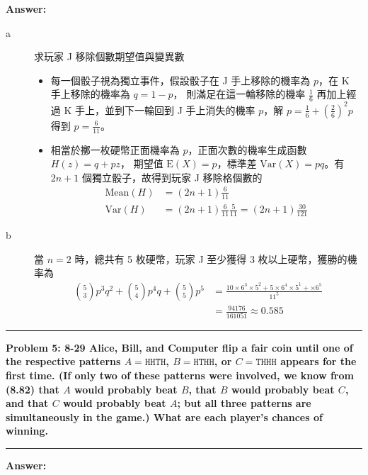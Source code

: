 \documentclass[11pt,fleqn]{article}
\newcommand\question[2]{\vspace{.25in}\hrule\textbf{#1: #2}\vspace{.5em}\hrule\vspace{.10in}}
\renewcommand\part[1]{\vspace{.10in}\textbf{#1}}
\begin{document}
\part{Answer:}

\begin{description}
	\item[a] 求玩家 J 移除個數期望值與變異數
		\begin{itemize}
			\item
			每一個骰子視為獨立事件，假設骰子在 J 手上移除的機率為 $p$，在 K 手上移除的機率為 $q = 1-p$，
			則滿足在這一輪移除的機率 
			$\frac{1}{6}$ 再加上經過 K 手上，並到下一輪回到 J 手上消失的機率 $p$，解
			$p = \frac{1}{6} + \left( \frac{2}{6}\right)^2 p$ 得到 $p = \frac{6}{11}$。
			\item 
			相當於擲一枚硬幣正面機率為 $p$，正面次數的機率生成函數 $H(z) = q + pz$，
			期望值 $\text{E}(X)=p$，標準差 $\text{Var}(X) = pq$。有 $2n+1$ 個獨立骰子，故得到玩家 J
			移除格個數的
				\begin{align*}
					\text{Mean}(H) &= (2n+1)\frac{6}{11} \\
					\text{Var}(H)&= (2n+1)\frac{6}{11}\frac{5}{11} = (2n+1)\frac{30}{121}
				\end{align*}
		\end{itemize}
	\item[b] 當 $n = 2$ 時，總共有 5 枚硬幣，玩家 J 至少獲得 3 枚以上硬幣，獲勝的機率為 
			\begin{align*}
				\binom{5}{3} p^3 q^2 + \binom{5}{4} p^4 q + \binom{5}{5} p^5 
					&= \frac{10 \times 6^3 \times 5^2 + 5 \times 6^4 \times 5^1 + 
						\times 6^5}{11^5} \\
					&= \frac{94176}{161051} \approx 0.585
			\end{align*}
\end{description}

\newpage

\question{Problem 5}{8-29 Alice, Bill, and Computer flip a fair coin until one of the respective
	patterns $A = \texttt{HHTH}$, $B = \texttt{HTHH}$, or $C = \texttt{THHH}$ appears for
	the first time. (If only two of these patterns were involved, we know from (8.82) that
	$A$ would probably beat $B$, that $B$ would probably beat $C$, and that $C$ would
	probably beat $A$; but all three patterns are simultaneously in the game.) 
	What are each player's chances of winning.
}

\part{Answer:}
\end{document}
